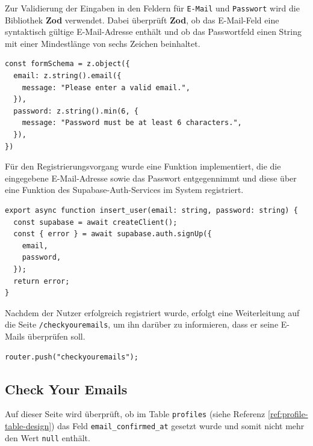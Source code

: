 \begin{inhalt}
Zur Validierung der Eingaben in den Feldern für \texttt{E-Mail} und \texttt{Passwort} wird die Bibliothek \textbf{Zod} verwendet. Dabei überprüft \textbf{Zod}, ob das E-Mail-Feld eine syntaktisch gültige E-Mail-Adresse enthält und ob das Passwortfeld einen String mit einer Mindestlänge von sechs Zeichen beinhaltet.


\begin{lstlisting}[style=mytsx]
const formSchema = z.object({
  email: z.string().email({
    message: "Please enter a valid email.",
  }),
  password: z.string().min(6, {
    message: "Password must be at least 6 characters.",
  }),
})
\end{lstlisting}

\newpage

Für den Registrierungsvorgang wurde eine Funktion implementiert, die die eingegebene E-Mail-Adresse sowie das Passwort entgegennimmt und diese über eine Funktion des Supabase-Auth-Services im System registriert.


\begin{lstlisting}[style=mytsx]
export async function insert_user(email: string, password: string) {
  const supabase = await createClient();
  const { error } = await supabase.auth.signUp({
    email,
    password,
  });
  return error;
}
\end{lstlisting}

Nachdem der Nutzer erfolgreich registriert wurde, erfolgt eine Weiterleitung auf die Seite \texttt{/checkyouremails}, um ihn darüber zu informieren, dass er seine E-Mails überprüfen soll.

\begin{lstlisting}[style=mytsx]
      router.push("checkyouremails");
\end{lstlisting}

\subsection{Check Your Emails}

Auf dieser Seite wird überprüft, ob im Table \texttt{profiles} (siehe Referenz \ref{ref:profile-table-design}) das Feld \texttt{email\_confirmed\_at} gesetzt wurde und somit nicht mehr den Wert \texttt{null} enthält.  




\end{inhalt}
